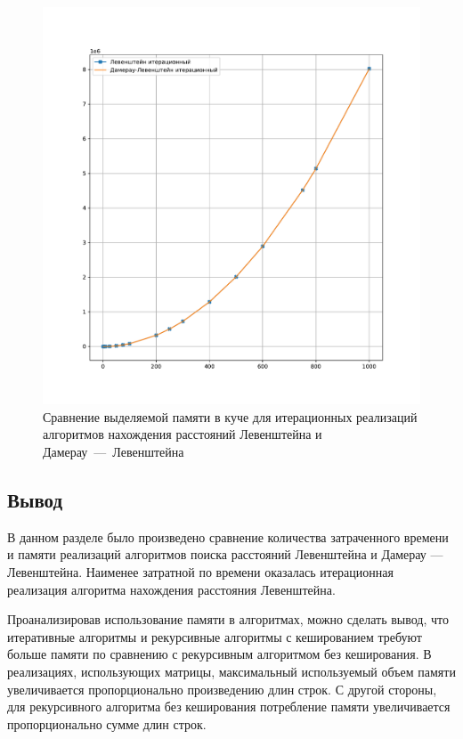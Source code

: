 \begin{figure}[H]
	\centering
	\includegraphics[width=\textwidth]{img/fn_iter_heap.pdf}
	\caption{Сравнение выделяемой памяти в куче для итерационных реализаций алгоритмов нахождения расстояний Левенштейна и Дамерау~---~Левенштейна}
	\label{fig:fn_iter_heap}
\end{figure}


\newpage

\subsection*{Вывод}

В данном разделе было произведено сравнение количества затраченного времени и памяти реализаций алгоритмов поиска расстояний Левенштейна и Дамерау --- Левенштейна. Наименее затратной по времени оказалась итерационная реализация алгоритма нахождения расстояния Левенштейна.

Проанализировав использование памяти в алгоритмах, можно сделать вывод, что итеративные алгоритмы и рекурсивные алгоритмы с кешированием требуют больше памяти по сравнению с рекурсивным алгоритмом без кеширования.
В реализациях, использующих матрицы, максимальный используемый объем памяти увеличивается пропорционально произведению длин строк.
С другой стороны, для рекурсивного алгоритма без кеширования потребление памяти увеличивается пропорционально сумме длин строк.
